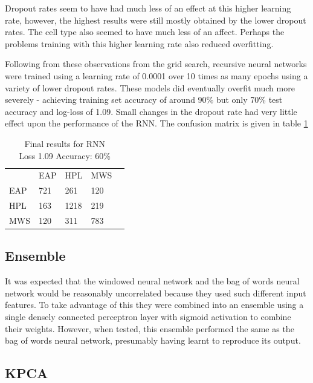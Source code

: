    Dropout rates seem to have had much less of an effect at this higher
    learning rate, however, the highest results were still mostly obtained by
    the lower dropout rates. The cell type also seemed to have much less of an
    affect. Perhaps the problems training with this higher learning rate also
    reduced overfitting.

    Following from these observations from the grid search, recursive neural
    networks were trained using a learning rate of 0.0001 over 10 times as many
    epochs using a variety of lower dropout rates. These models did eventually
    overfit much more severely - achieving training set accuracy of around 90\%
    but only 70\% test accuracy and log-loss of 1.09. Small changes in the
    dropout rate had very little effect upon the performance of the RNN. The
    confusion matrix is given in table \ref{tab:rnn_res}

\begin{table}[h]
\centering
\begin{tabular}{m{1cm}|m{1cm}|m{1cm}|m{1cm}|m{0cm}}
\multicolumn{1}{m{1cm}}{} & \multicolumn{1}{m{1cm}}{EAP} & \multicolumn{1}{m{1cm}}{HPL} & \multicolumn{1}{m{1cm}}{MWS} &\\[5pt]
\cline{2-4}
EAP & 721 & 261 & 120 & \\[5pt]
\cline{2-4}
HPL & 163 & 1218 & 219 & \\[5pt]
\cline{2-4}
MWS & 120 & 311 & 783 & \\[5pt]
\cline{2-4}
\end{tabular}
\caption{Final results for RNN\\Loss 1.09 Accuracy: 60\% }
\label{tab:rnn_res}
\end{table}


    \subsection{Ensemble}
    \label{sec:ensemble}

    It was expected that the windowed neural network and the bag of words neural
    network would be reasonably uncorrelated because they used such different
    input features. To take advantage of this they were combined into an
    ensemble using a single densely connected perceptron layer with sigmoid
    activation to combine their weights. However, when tested, this ensemble
    performed the same as the bag of words neural network, presumably having
    learnt to reproduce its output.

\subsection{KPCA}
\label{sec:kpca}
  
